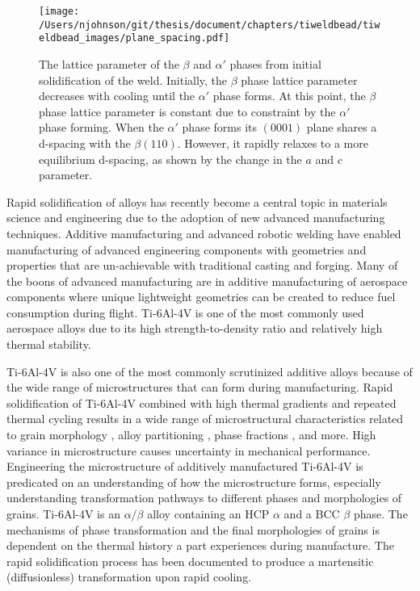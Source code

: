 \begin{figure*}[t]
    \centering
    \texttt{[image: /Users/njohnson/git/thesis/document/chapters/tiweldbead/tiweldbead\_images/plane\_spacing.pdf]}
    \caption{The lattice parameter of the $\beta$ and $\alpha'$ phases from initial solidification of the weld. Initially, the $\beta$ phase lattice parameter decreases with cooling until the $\alpha'$ phase forms. At this point, the $\beta$ phase lattice parameter is constant due to constraint by the $\alpha'$ phase forming. When the $\alpha'$ phase forms its $(0001)$ plane shares a d-spacing with the $\beta (110)$. However, it rapidly relaxes to a more equilibrium d-spacing, as shown by the change in the $a$ and $c$ parameter.}
    \label{fig:latparams}
\end{figure*}

Rapid solidification of alloys has recently become a central topic in materials science and engineering due to the adoption of new advanced manufacturing techniques. Additive manufacturing and advanced robotic welding have enabled manufacturing of advanced engineering components with geometries and properties that are un-achievable with traditional casting and forging. Many of the boons of advanced manufacturing are in additive manufacturing of aerospace components where unique lightweight geometries can be created to reduce fuel consumption during flight. Ti-6Al-4V is one of the most commonly used aerospace alloys due to its high strength-to-density ratio and relatively high thermal stability. 

Ti-6Al-4V is also one of the most commonly scrutinized additive alloys because of the wide range of microstructures that can form during manufacturing. Rapid solidification of Ti-6Al-4V combined with high thermal gradients and repeated thermal cycling results in a wide range of microstructural characteristics related to grain morphology \cite{Semiatin1997, Ahmed1998, Plichta1977, Beladi2014, Katzarov2002}, alloy partitioning \cite{Szkliniarz1995, Fan2005, Boivineau2006, Sridharan2019}, phase fractions \cite{Tan2016}, and more. High variance in microstructure causes uncertainty in mechanical performance. Engineering the microstructure of additively manufactured Ti-6Al-4V is predicated on an understanding of how the microstructure forms, especially understanding transformation pathways to different phases and morphologies of grains. Ti-6Al-4V is an $\alpha/\beta$ alloy containing an HCP $\alpha$ and a BCC $\beta$ phase. The mechanisms of phase transformation and the final morphologies of grains is dependent on the thermal history a part experiences during manufacture. The rapid solidification process has been documented to produce a martensitic (diffusionless) transformation upon rapid cooling.

